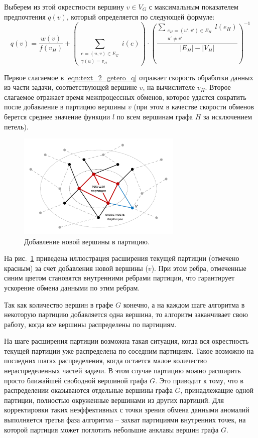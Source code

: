 Выберем из этой окрестности вершину $v \in V_G$ с максимальным показателем предпочтения $q(v)$, который определяется по следующей формуле:
\begin{equation}\label{eqn:text_2_getero_q}
	q(v) = \frac{w(v)}{f(v_H)} +
		\left( \sum_{\substack{e = (u, v) \in E_G \\ \gamma(u) = v_H}}{i(e)} \right) \cdot
		\left( \frac{\sum_{\substack{e_H = (u', v') \in E_H \\ u' \ne v'}}{l(e_H)}}{|E_H| - |V_H|} \right)^{-1}
\end{equation}

Первое слагаемое в \eqref{eqn:text_2_getero_q} отражает скорость обработки данных из части задачи, соответствующей вершине $v$, на вычислителе $v_H$.
Второе слагаемое отражает время межпроцессных обменов, которое удастся сократить после добавление в партицию вершины $v$ (при этом в качестве скорости обменов берется среднее значение функции $l$ по всем вершинам графа $H$ за исключением петель).

\begin{figure}[ht]
\centering
\includegraphics[width=0.7\textwidth]{./pics/text_2_getero/partition.pdf}
\caption{Добавление новой вершины в партицию.}
\label{fig:text_2_getero_partition}
\end{figure}

На рис.~\ref{fig:text_2_getero_partition} приведена иллюстрация расширения текущей партиции (отмечено красным) за счет добавления новой вершины ($v$).
При этом ребра, отмеченные синим цветом становятся внутренними ребрами партиции, что гарантирует ускорение обмена данными по этим ребрам.

Так как количество вершин в графе $G$ конечно, а на каждом шаге алгоритма в некоторую партицию добавляется одна вершина, то алгоритм заканчивает свою работу, когда все вершины распределены по партициям.

На шаге расширения партиции возможна такая ситуация, когда вся окрестность текущей партиции уже распределена по соседним партициям.
Такое возможно на последних шагах распределения, когда остается малое количество нераспределенных частей задачи.
В этом случае партицию можно расширить просто ближайшей свободной вершиной графа $G$.
Это приводит к тому, что в распределении оказываются отдельные вершины графа $G$, принадлежащие одной партиции, полностью окруженные вершинами из других партиций.
Для корректировки таких неэффективных с точки зрения обмена данными аномалий выполняется третья фаза алгоритма -- захват партициями внутренних точек, на которой партиция может поглотить небольшие анклавы вершин графа $G$.

